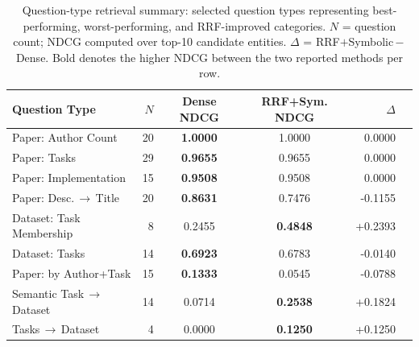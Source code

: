\begin{table}[ht]
  \centering
  \footnotesize
  \caption{Question-type retrieval summary: selected question types representing best-performing, worst-performing, and RRF-improved categories. $N$ = question count; NDCG computed over top-10 candidate entities. $\Delta$ = RRF$+$Symbolic\,$-$\,Dense. Bold denotes the higher NDCG between the two reported methods per row.}
  \label{tab:retrieval_question_type_summary}
  \begin{tabular}{lrccrr}
    \toprule
    \textbf{Question Type} & $N$ & \textbf{Dense NDCG} & \textbf{RRF+Sym. NDCG} & $\Delta$ \\
    \midrule
    Paper: Author Count & 20 & \textbf{1.0000} & 1.0000 & 0.0000 \\
    Paper: Tasks & 29 & \textbf{0.9655} & 0.9655 & 0.0000 \\
    Paper: Implementation & 15 & \textbf{0.9508} & 0.9508 & 0.0000 \\
    Paper: Desc.\,$\to$\,Title & 20 & \textbf{0.8631} & 0.7476 & -0.1155 \\
    Dataset: Task Membership & 8 & 0.2455 & \textbf{0.4848} & +0.2393 \\
    Dataset: Tasks & 14 & \textbf{0.6923} & 0.6783 & -0.0140 \\
    Paper: by Author+Task & 15 & \textbf{0.1333} & 0.0545 & -0.0788 \\
    Semantic Task\,$\to$\,Dataset & 14 & 0.0714 & \textbf{0.2538} & +0.1824 \\
    Tasks\,$\to$\,Dataset & 4 & 0.0000 & \textbf{0.1250} & +0.1250 \\
    \bottomrule
  \end{tabular}
\end{table}